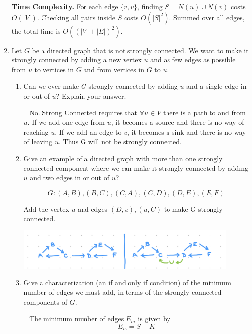 \documentclass[12pt, letterpaper]{article}
\begin{document}
\begin{enumerate}
    \textbf{Time Complexity.} \medskip \newline
    For each edge $\{u, v\}$, finding $S=N(u)\cup N(v)$ costs $O(|V|)$. Checking all pairs inside $S$ costs $O(|S|^2)$. Summed over all edges, the total time is $O((|V| + |E|)^2)$.

\newpage
\item
Let $G$ be a directed graph that is not strongly connected.
We want to make it strongly connected by adding a new vertex $u$ and
as few edges as possible from $u$ to vertices in $G$ and from vertices
in $G$ to $u$.  

\begin{enumerate}

\item Can we ever make $G$ strongly connected by adding $u$ and a single edge
in or out of $u$? Explain your answer.

\-\ \newline
No. Strong Connected requires that \(\forall u \in V\) there is a path to and from \(u\). If we add one edge from \(u\), it becomes a source and there is no way of reaching \(u\). If we add an edge to \(u\), it becomes a sink and there is no way of leaving \(u\). Thus G will not be strongly connected. 
\-\ \newline

\item Give an example of a directed graph with more than one strongly connected component where we can make it strongly connected by adding $u$ and two edges
in or out of $u$?

\[
G: (A, B), (B, C), (C, A), (C, D), (D, E), (E, F)
\]

Add the vertex \(u\) and edges \( (D, u), (u, C) \) to make G strongly connected. 

\includegraphics[width=0.9\textwidth]{src/CSE101 hw2 q3.png}


\item Give a characterization (an if and only if condition) of the minimum number of edges we must add,
in terms of the strongly connected components of $G$.

\-\ \newline 
The minimum number of edges \(E_m\) is given by
\[
E_m = S + K
\]


\end{enumerate}
\end{enumerate}
\end{document}
